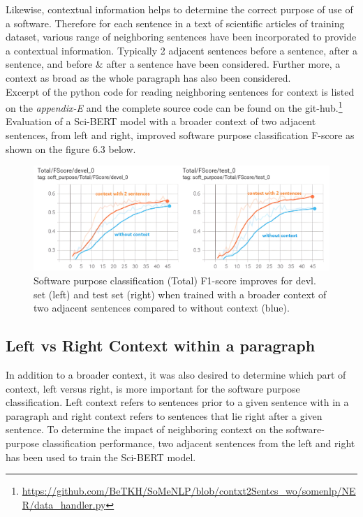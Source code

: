 Likewise, contextual information helps to determine the correct purpose of use of a software. Therefore for each sentence in a text of scientific articles of training dataset, various range of neighboring sentences have been incorporated to provide a contextual information. Typically 2 adjacent sentences before a sentence, after a sentence, and before \& after a sentence have been considered. Further more, a context as broad as the whole paragraph has also been considered. \\

Excerpt of the python code for reading neighboring sentences for context is listed on the \emph{appendix-E} and the complete source code can be found on the git-hub.\footnote{\url{https://github.com/BeTKH/SoMeNLP/blob/contxt2Sentcs_wo/somenlp/NER/data_handler.py}}\\

Evaluation of a Sci-BERT model with a broader context of two adjacent sentences, from left and right, improved software purpose classification F-score as shown on the figure 6.3 below. 

\begin{figure}[htbp]
	\centering
	\includegraphics[width=.86\textwidth]{4.graphics/figures/ch_6/2.left_context_vs_right/HD/braoderContextFscore}
	\caption{Software purpose classification (Total) F1-score improves for devl. set (left) and test set (right) when trained with a broader context of two adjacent sentences compared to without context (blue).}
	\label{fig:chapter06:withvswithout}
\end{figure}

\subsection{Left vs Right Context within a paragraph}
\label{sec:chapter06:leftvsright}

In addition to a broader context, it was also desired to determine which part of context, left versus right, is more important for the software purpose classification. Left context refers to sentences prior to a given sentence with in  a paragraph and right context refers to sentences that lie right after a given sentence. To determine the impact of neighboring context on the software-purpose classification performance, two adjacent sentences from the left and right has been used to train the Sci-BERT model.  \\

